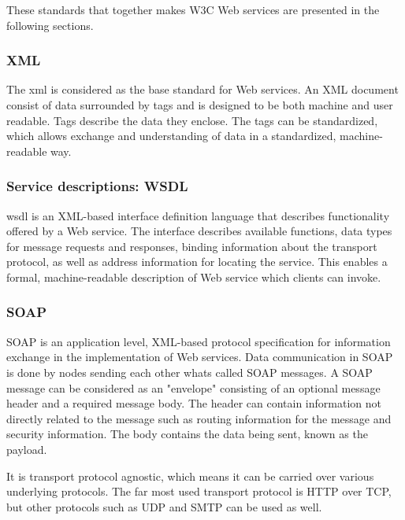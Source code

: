 These standards that together makes W3C Web services are presented in the
following sections.

\subsubsection{XML}

The \gls{xml}\cite{W3C-XML} is considered as the base standard for Web services.
An XML document consist of data surrounded by tags and is designed to be both
machine and user readable. Tags describe the data they enclose. The tags can be
standardized, which allows exchange and understanding of data in a standardized,
machine-readable way.


\subsubsection{Service descriptions: WSDL}

\gls{wsdl} is an XML-based interface definition language that describes
functionality offered by a Web service\cite{w3c-wsdl}. The interface describes
available functions, data types for message requests and responses, binding
information about the transport protocol, as well as address information for
locating the service. This enables a formal, machine-readable description of Web
service which clients can invoke.

\subsubsection{SOAP}

SOAP is an application level, XML-based protocol specification for information
exchange\cite{w3c-soap} in the implementation of Web services. Data
communication in SOAP is done by nodes sending each other whats called SOAP
messages. A SOAP message can be considered as an "envelope" consisting of an
optional message header and a required message body. The header can contain
information not directly related to the message such as routing information for
the message and security information. The body contains the data being sent,
known as the payload.

It is transport protocol agnostic, which means it can be carried over various
underlying protocols. The far most used transport protocol is HTTP over TCP, but
other protocols such as UDP and SMTP can be used as well.

\subsection{}
\label{rest}

